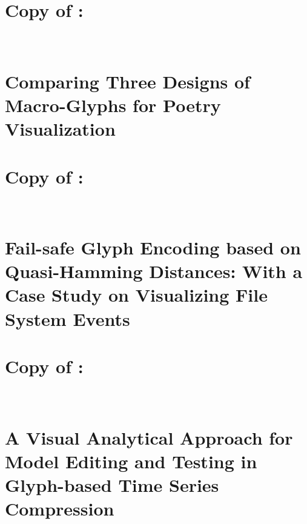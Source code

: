 \documentclass[a4paper]{article}
\begin{document}
\section{Copy of \cite{CGF:abdul-rahman14-sp}:\\~\\~\\Comparing Three Designs of Macro-Glyphs for Poetry Visualization}\label{app:eurovis-poem-sp-14}


\section{Copy of \cite{legg14}:\\~\\~\\Fail-safe Glyph Encoding based on Quasi-Hamming Distances: With a Case Study on Visualizing File System Events}\label{app:legg-14}


\section{Copy of \cite{maguire14}:\\~\\~\\A Visual Analytical Approach for Model Editing and Testing in Glyph-based Time Series Compression}\label{app:ieee-14}

\end{document}
